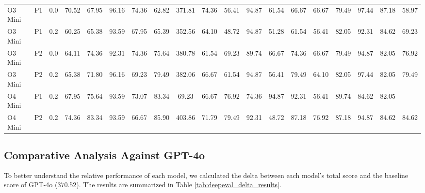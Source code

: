 \begin{landscape}
\begin{longtable}{|l|c|c|ccccc|c|ccccc|ccccc|}
        O3 Mini & P1 & 0.0 & 70.52 & 67.95 & 96.16 & 74.36 & 62.82 & 371.81 & 74.36 & 56.41 & 94.87 & 61.54 & 66.67 & 66.67 & 79.49 & 97.44 & 87.18 & 58.97 \\
        O3 Mini & P1 & 0.2 & 60.25 & 65.38 & 93.59 & 67.95 & 65.39 & 352.56 & 64.10 & 48.72 & 94.87 & 51.28 & 61.54 & 56.41 & 82.05 & 92.31 & 84.62 & 69.23 \\
        O3 Mini & P2 & 0.0 & 64.11 & 74.36 & 92.31 & 74.36 & 75.64 & 380.78 & 61.54 & 69.23 & 89.74 & 66.67 & 74.36 & 66.67 & 79.49 & 94.87 & 82.05 & 76.92 \\
        O3 Mini & P2 & 0.2 & 65.38 & 71.80 & 96.16 & 69.23 & 79.49 & 382.06 & 66.67 & 61.54 & 94.87 & 56.41 & 79.49 & 64.10 & 82.05 & 97.44 & 82.05 & 79.49 \\
        O4 Mini & P1 & 0.2 & 67.95 & 75.64 & 93.59 & 73.07 & 83.34 & 69.23 & 66.67 & 76.92 & 74.36 & 94.87 & 92.31 & 56.41 & 89.74 & 84.62 & 82.05 \\
        O4 Mini & P2 & 0.2 & 74.36 & 83.34 & 93.59 & 66.67 & 85.90 & 403.86 & 71.79 & 79.49 & 92.31 & 48.72 & 87.18 & 76.92 & 87.18 & 94.87 & 84.62 & 84.62 \\
    \end{longtable}
\end{landscape}
\clearpage
\restoregeometry
\pagestyle{headings}

\subsection{Comparative Analysis Against GPT-4o}
\label{sec:comparative_analysis_gpt4o}

To better understand the relative performance of each model, we calculated the delta between each model's total score and the baseline score of GPT-4o (370.52). The results are summarized in Table \ref{tab:deepeval_delta_results}.

